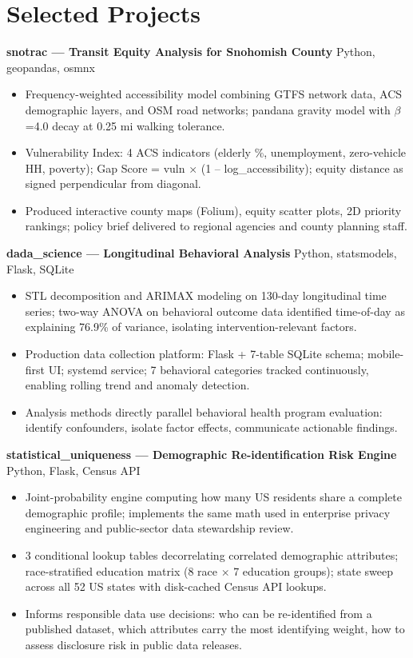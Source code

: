 \documentclass[11pt,a4paper]{article}
\begin{document}
\section*{Selected Projects}

\noindent
\textbf{snotrac --- Transit Equity Analysis for Snohomish County} \hfill Python, geopandas, osmnx
\begin{itemize}
    \item Frequency-weighted accessibility model combining GTFS network data, ACS demographic layers, and OSM road networks; pandana gravity model with $\beta$=4.0 decay at 0.25 mi walking tolerance.
    \item Vulnerability Index: 4 ACS indicators (elderly \%, unemployment, zero-vehicle HH, poverty); Gap Score = vuln $\times$ (1 -- log\_accessibility); equity distance as signed perpendicular from diagonal.
    \item Produced interactive county maps (Folium), equity scatter plots, 2D priority rankings; policy brief delivered to regional agencies and county planning staff.
\end{itemize}

\vspace{0.2cm}
\noindent
\textbf{dada\_science --- Longitudinal Behavioral Analysis} \hfill Python, statsmodels, Flask, SQLite
\begin{itemize}
    \item STL decomposition and ARIMAX modeling on 130-day longitudinal time series; two-way ANOVA on behavioral outcome data identified time-of-day as explaining 76.9\% of variance, isolating intervention-relevant factors.
    \item Production data collection platform: Flask + 7-table SQLite schema; mobile-first UI; systemd service; 7 behavioral categories tracked continuously, enabling rolling trend and anomaly detection.
    \item Analysis methods directly parallel behavioral health program evaluation: identify confounders, isolate factor effects, communicate actionable findings.
\end{itemize}

\vspace{0.2cm}
\noindent
\textbf{statistical\_uniqueness --- Demographic Re-identification Risk Engine} \hfill Python, Flask, Census API
\begin{itemize}
    \item Joint-probability engine computing how many US residents share a complete demographic profile; implements the same math used in enterprise privacy engineering and public-sector data stewardship review.
    \item 3 conditional lookup tables decorrelating correlated demographic attributes; race-stratified education matrix (8 race $\times$ 7 education groups); state sweep across all 52 US states with disk-cached Census API lookups.
    \item Informs responsible data use decisions: who can be re-identified from a published dataset, which attributes carry the most identifying weight, how to assess disclosure risk in public data releases.
\end{itemize}
\end{document}
